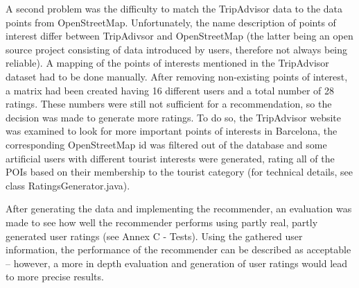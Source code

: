 A second problem was the difficulty to match the TripAdvisor data to the data points from OpenStreetMap. Unfortunately, the name description of points of interest differ between TripAdivsor and OpenStreetMap (the latter being an open source project consisting of data introduced by users, therefore not always being reliable). A mapping of the points of interests mentioned in the TripAdvisor dataset had to be done manually. After removing non-existing points of interest, a matrix had been created having 16 different users and a total number of 28 ratings. These numbers were still not sufficient for a recommendation, so the decision was made to generate more ratings.  To do so, the TripAdvisor website was examined to look for more important points of interests in Barcelona, the corresponding OpenStreetMap id was filtered out of the database and some artificial users with different tourist interests were generated, rating all of the POIs based on their membership to the tourist category (for technical details, see class RatingsGenerator.java).

After generating the data and implementing the recommender, an evaluation was made to see how well the recommender performs using partly real, partly generated user ratings (see Annex C - Tests). Using the gathered user information, the performance of the recommender can be described as acceptable – however, a more in depth evaluation and generation of user ratings would lead to more precise results.

